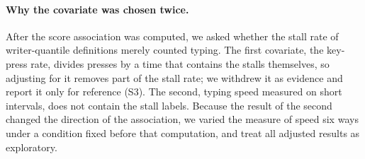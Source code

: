\paragraph{Why the covariate was chosen twice.} After the score association was computed, we asked whether the stall
rate of writer-quantile definitions merely counted typing. The first covariate, the key-press rate, divides presses by
a time that contains the stalls themselves, so adjusting for it removes part of the stall rate; we withdrew it as
evidence and report it only for reference (S3). The second, typing speed measured on short intervals, does not contain
the stall labels. Because the result of the second changed the direction of the association, we varied the measure of
speed six ways under a condition fixed before that computation, and treat all adjusted results as exploratory.


